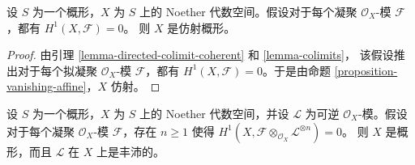 \begin{lemma}
\label{lemma-Noetherian-h1-zero}
设 $S$ 为一个概形，$X$ 为 $S$ 上的 Noether 代数空间。假设对于每个凝聚
$\mathcal{O}_X$-模 $\mathcal{F}$，都有 $H^1(X, \mathcal{F}) = 0$。
则 $X$ 是仿射概形。
\end{lemma}

\begin{proof}
由引理 \ref{lemma-directed-colimit-coherent} 和 \ref{lemma-colimits}，
该假设推出对于每个拟凝聚 $\mathcal{O}_X$-模 $\mathcal{F}$，都有
$H^1(X, \mathcal{F}) = 0$。于是由命题
\ref{proposition-vanishing-affine}，$X$ 仿射。
\end{proof}

\begin{lemma}
\label{lemma-Noetherian-h1-zero-invertible}
设 $S$ 为一个概形，$X$ 为 $S$ 上的 Noether 代数空间，并设
$\mathcal{L}$ 为可逆 $\mathcal{O}_X$-模。假设对于每个凝聚
$\mathcal{O}_X$-模 $\mathcal{F}$，存在 $n \geq 1$ 使得
$H^1(X, \mathcal{F} \otimes_{\mathcal{O}_X} \mathcal{L}^{\otimes n}) = 0$。
则 $X$ 是概形，而且 $\mathcal{L}$ 在 $X$ 上是丰沛的。
\end{lemma}

